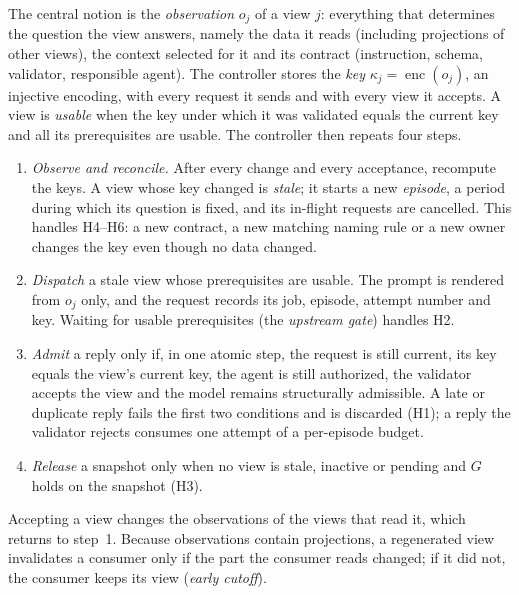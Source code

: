 \documentclass[pdflatex,sn-mathphys-num]{sn-jnl}
\theoremstyle{thmstyleone}%
\theoremstyle{thmstyletwo}%
\theoremstyle{thmstylethree}%
\newcommand{\key}{\kappa}
\newcommand{\enc}{\operatorname{enc}}
\begin{document}
The central notion is the \emph{observation} $o_j$ of a view $j$: everything that determines the question the view answers, namely the data it reads (including projections of other views), the context selected for it and its contract (instruction, schema, validator, responsible agent). The controller stores the \emph{key} $\key_j=\enc(o_j)$, an injective encoding, with every request it sends and with every view it accepts. A view is \emph{usable} when the key under which it was validated equals the current key and all its prerequisites are usable. The controller then repeats four steps.
\begin{enumerate}
\item \emph{Observe and reconcile.} After every change and every acceptance, recompute the keys. A view whose key changed is \emph{stale}; it starts a new \emph{episode}, a period during which its question is fixed, and its in-flight requests are cancelled. This handles H4--H6: a new contract, a new matching naming rule or a new owner changes the key even though no data changed.
\item \emph{Dispatch} a stale view whose prerequisites are usable. The prompt is rendered from $o_j$ only, and the request records its job, episode, attempt number and key. Waiting for usable prerequisites (the \emph{upstream gate}) handles H2.
\item \emph{Admit} a reply only if, in one atomic step, the request is still current, its key equals the view's current key, the agent is still authorized, the validator accepts the view and the model remains structurally admissible. A late or duplicate reply fails the first two conditions and is discarded (H1); a reply the validator rejects consumes one attempt of a per-episode budget.
\item \emph{Release} a snapshot only when no view is stale, inactive or pending and $G$ holds on the snapshot (H3).
\end{enumerate}
Accepting a view changes the observations of the views that read it, which returns to step~1. Because observations contain projections, a regenerated view invalidates a consumer only if the part the consumer reads changed; if it did not, the consumer keeps its view (\emph{early cutoff}).
\end{document}
